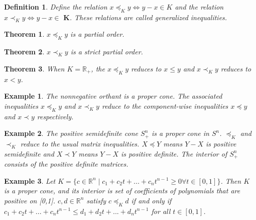 \documentclass[a4paper]{article}
\newtheorem{mytheorem}{Theorem}
\newtheorem{example}{Example}
\newtheorem{mydef}{Definition}
\numberwithin{mytheorem}{section}
\numberwithin{mydef}{section}
\numberwithin{example}{section}
\begin{document}
\begin{mydef} Define the relation $x \preceq_{K} y \iff y - x \in K$ and the relation $x \prec_{K} y \iff y - x \in \textbf{ K}$. These relations are called generalized inequalities.\end{mydef}

\begin{mytheorem} $x \preceq_{K} y$ is a partial order.
\end{mytheorem}

\begin{mytheorem} $x \prec_{K} y$ is a strict partial order.
\end{mytheorem}

\begin{mytheorem} When $K = \mathbb{R}_{+}$, the $x \preceq_{K} y$ reduces to $x \leq y$ and $x \prec_{K} y$ reduces to $x < y$.
\end{mytheorem}

\begin{example} The nonnegative orthant is a proper cone. The associated inequalities $x \preceq_{K} y$ and $x \prec_{K} y$ reduce to the component-wise inequalities $x \preceq y$ and $x \prec y$ respectively.  
\end{example}

\begin{example} The positive semidefinite cone $S^{n}_{+}$ is a proper cone in $S^{n}$. $\preceq_{K}$ and $\prec_{K}$ reduce to the usual matrix inequalities. $X \preceq Y$ means $Y - X$ is positive semidefinite and $X \prec Y$ means $Y - X$ is positive definite. The interior of $S^{n}_{+}$ consists of the positive definite matrices. 
\end{example}

\begin{example} Let $K = \{ c \in \mathbb{R}^{n} \mid c_{1} + c_{2}t + ... + c_{n}t^{n-1} \geq 0 \forall t \in [0,1] \}$. Then $K$ is a proper cone, and its interior is set of coefficients of polynomials that are positive on [0,1]. $c,d \in \mathbb{R}^{n}$ satisfy $c \preceq_{K} d$ if and only if $c_{1} + c_{2}t +...+ c_{n}t^{n-1} \leq d_{1} + d_{2}t +...+ d_{n}t^{n-1}$ for all $t \in [0,1]$.
\end{example}
\end{document}
